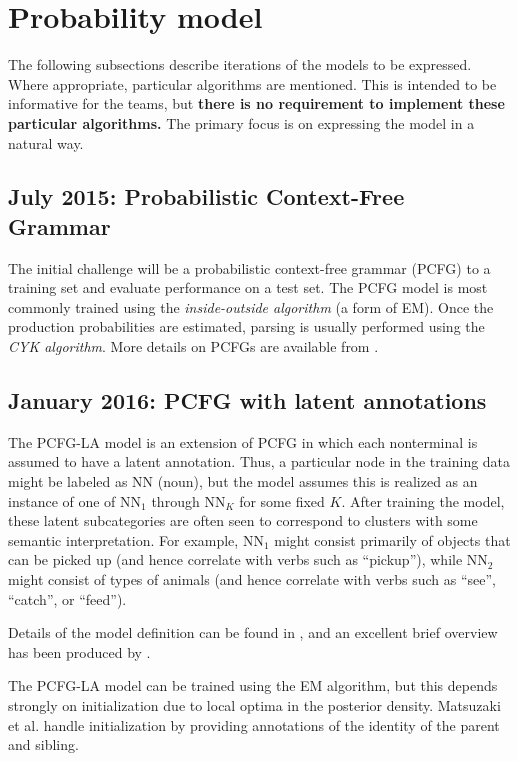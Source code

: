 \documentclass[english]{article}
\begin{document}
\section{Probability model}

The following subsections describe iterations of the models to be expressed. Where appropriate, particular algorithms are mentioned. This is intended to be informative for the teams, but \textbf{there is no requirement to implement these particular algorithms.} The primary focus is on expressing the model in a natural way.
 
\subsection{July 2015: Probabilistic Context-Free Grammar}

The initial challenge will be a probabilistic context-free grammar (PCFG) to a training set and evaluate performance on a test set. The PCFG model is most commonly trained using the \emph{inside-outside algorithm} (a form of EM). Once the production probabilities are estimated, parsing is usually performed using the \emph{CYK algorithm}. More details on PCFGs are available from \citet{Collins}.

\subsection{January 2016: PCFG with latent annotations}

The PCFG-LA model is an extension of PCFG in which each nonterminal is assumed to have a latent annotation. Thus, a particular node in the training data might be labeled as NN (noun), but the model assumes this is realized as an instance of one of NN$_{1}$ through NN$_{K}$ for some fixed $K$. After training the model, these latent subcategories are often seen to correspond to clusters with some semantic interpretation. For example, NN$_{1}$ might consist primarily of objects that can be picked up (and hence correlate with verbs such as ``pickup''), while NN$_{2}$ might consist of types of animals (and hence correlate with verbs such as ``see'', ``catch'', or ``feed'').

Details of the model definition can be found in \citet{Matsuzaki2005}, and an excellent brief overview has been produced by \citet{Manning2012}.

The PCFG-LA model can be trained using the EM algorithm, but this depends strongly on initialization due to local optima in the posterior density. Matsuzaki et al. handle initialization by providing annotations of the identity of the parent and sibling. 
\end{document}
